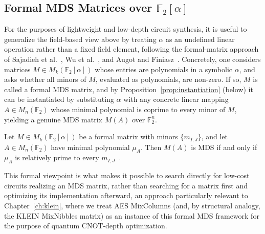 \subsection{Formal MDS Matrices over $\mathbb{F}_2[\alpha]$}

For the purposes of lightweight and low-depth circuit synthesis, it is useful to
generalize the field-based view above by treating $\alpha$ as an
undefined linear operation rather than a fixed field element, following
the formal-matrix approach of Sajadieh et al.~\cite{sajadieh2012recursive}, Wu et al.~\cite{ciphers2013recursive},
and Augot and Finiasz~\cite{augot2013exhaustive}. Concretely, one considers matrices $M \in
M_k(\mathbb{F}_2[\alpha])$ whose entries are polynomials in a symbolic
$\alpha$, and asks whether all minors of $M$, evaluated as polynomials, are
non-zero. If so, $M$ is called a formal MDS matrix, and by
Proposition~\ref{prop:instantiation} (below) it can be instantiated by
substituting $\alpha$ with any concrete linear mapping $A \in M_n(\mathbb{F}_2)$
whose minimal polynomial is coprime to every minor of $M$, yielding a genuine
MDS matrix $M(A)$ over $\mathbb{F}_2^n$.

\begin{proposition}
\label{prop:instantiation}
Let $M \in M_k(\mathbb{F}_2[\alpha])$ be a formal matrix with minors
$\{m_{I,J}\}$, and let $A \in M_n(\mathbb{F}_2)$ have minimal polynomial
$\mu_A$. Then $M(A)$ is MDS if and only if $\mu_A$ is relatively prime to
every $m_{I,J}$~\cite{duval2018mds}.
\end{proposition}

This formal viewpoint is what makes it possible to search directly for
low-cost circuits realizing an MDS matrix, rather than searching for a
matrix first and optimizing its implementation afterward, an approach
particularly relevant to Chapter~\ref{ch:klein}, where we treat AES MixColumns
(and, by structural analogy, the KLEIN MixNibbles matrix) as an instance of
this formal MDS framework for the purpose of quantum CNOT-depth optimization.